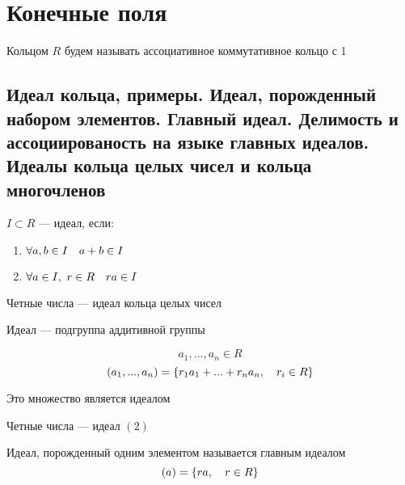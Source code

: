 \documentclass[main.tex]{subfiles}
\begin{document}
    \section{Конечные поля}
    Кольцом $R$ будем называть ассоциативное коммутативное кольцо с 1
    \subsection{Идеал кольца, примеры. Идеал, порожденный набором элементов. Главный идеал. Делимость и ассоциированость на языке главных идеалов. Идеалы кольца целых чисел и кольца многочленов}

    \begin{definition}
        $I \subset R$ --- идеал, если:
        \begin{enumerate}
            \item $\forall a,b \in I \quad a + b \in I$
            \item $\forall a \in I,\ r \in R \quad ra \in I$
        \end{enumerate}
    \end{definition}

    \begin{example}
        Четные числа --- идеал кольца целых чисел
    \end{example}

    \begin{remark}

        Идеал --- подгруппа аддитивной группы
    \end{remark}

    \begin{Definition}[конструкция]
        \[a_1,..., a_n \in R\]
        \[(a_1,...,a_n) = \{ r_1 a_1 + ... + r_n a_n,\quad r_i \in R\} \]
    \end{Definition}

    \begin{utv}
        Это множество является идеалом
    \end{utv}

    \begin{example}
        Четные числа --- идеал $(2)$
    \end{example}

    \begin{definition}
        Идеал, порожденный одним элементом называется главным идеалом
        \[(a) = \{ ra,\quad r \in R\}\]
    \end{definition}
\end{document}
